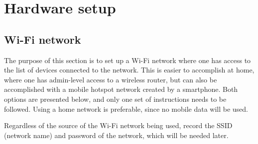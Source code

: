 \documentclass{article}
\begin{document}
\section{Hardware setup}

\subsection{Wi-Fi network}

The purpose of this section is to set up a Wi-Fi network where one has access to the list of devices connected to the network. This is easier to accomplish at home, where one has admin-level access to a wireless router, but can also be accomplished with a mobile hotspot network created by a smartphone. Both options are presented below, and only one set of instructions needs to be followed. Using a home network is preferable, since no mobile data will be used.

Regardless of the source of the Wi-Fi network being used, record the SSID (network name) and password of the network, which will be needed later.
\end{document}

